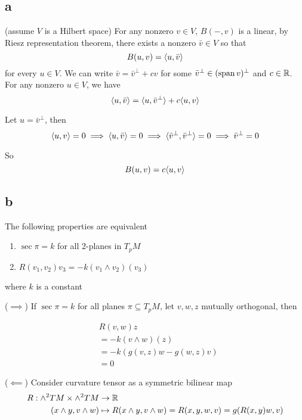 \subsection{a}

(assume $V$ is a Hilbert space) For any nonzero $v \in V$, $B(-, v)$ is a linear, by Riesz representation theorem, there exists a nonzero $\bar{v} \in V$ so that
$$
	B(u, v) = \langle u, \bar{v}\rangle
$$
for every $u \in V$. We can write $\bar{v} = \bar{v}^\perp + c v$ for some $\bar{v}^\perp \in (\operatorname{span}{v})^\perp$ and $c \in \mathbb{R}$. For any nonzero $u \in V$, we have
$$
	\langle u, \bar{v}\rangle = \langle u, \bar{v}^\perp\rangle + c \langle u, v\rangle
$$

Let $u = \bar{v}^\perp$, then 
$$
	\langle u, v\rangle = 0 \implies \langle u, \bar{v}\rangle = 0 \implies \langle\bar{v}^\perp, \bar{v}^\perp\rangle = 0 \implies \bar{v}^\perp = 0
$$

So
$$
	B(u, v) = c \langle u, v\rangle
$$
 
\subsection{b}

\begin{lemma}
	The following properties are equivalent
	\begin{enumerate}
		\item $\sec \pi = k$ for all $2$-planes in $T_p M$
		\item $R(v_1, v_2)v_3 = -k (v_1 \wedge v_2) (v_3)$
	\end{enumerate}
	where $k$ is a constant
\end{lemma}

($\implies$) If $\sec \pi = k$ for all planes $\pi \subseteq T_p M$, let $v, w, z$ mutually orthogonal, then 

\begin{align*}
	&R(v, w)z \\
	&= -k (v \wedge w) (z) \\
	&= -k (g(v, z) w - g(w, z) v) \\
	&= 0
\end{align*}

($\impliedby$) Consider curvature tensor as a symmetric bilinear map
\begin{align*}
	R: \wedge^2 TM \times \wedge^2 TM &\to \mathbb{R} \\
		(x \wedge y, v \wedge w) &\mapsto R(x \wedge y, v \wedge w) = R(x, y, w, v) = g(R(x, y)w, v)
\end{align*}


